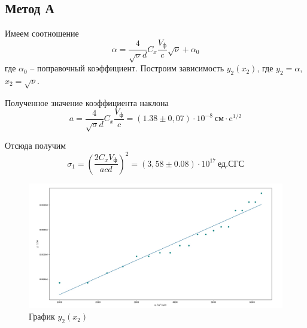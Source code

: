 \documentclass[a4paper,12pt]{article}
\theoremstyle{definition}
\begin{document}
	\subsection{Метод А}
	
	Имеем соотношение
	\begin{equation}
		\alpha = \frac{4}{\sqrt{\sigma} d}C_x\frac{V_\text{ф}}{c}\sqrt{\nu}+\alpha_0
	\end{equation}
	где $\alpha_0$ -- поправочный коэффициент. Построим зависимость $y_2(x_2)$, где $y_2=\alpha$, $x_2=\sqrt{\nu}$.
	
	Полученное значение коэффициента наклона
	\begin{equation}
		a=\frac{4}{\sqrt{\sigma} d}C_x\frac{V_\text{ф}}{c}=(1.38\pm0,07)\cdot10^{-8}\:\text{см}\cdot\text{c}^{1/2}
	\end{equation}

	Отсюда получим
	\begin{equation}
		\sigma_1 = \left(\frac{2C_xV_\text{ф}}{acd}\right)^2=(3,58\pm0.08)\cdot10^{17}\:\text{ед.СГС}
	\end{equation}
	
	\begin{figure}[h]
		\centering
		\includegraphics[scale=0.3]{4.jpg}
		\caption{График $y_2(x_2)$}
	\end{figure}
	
\end{document}

